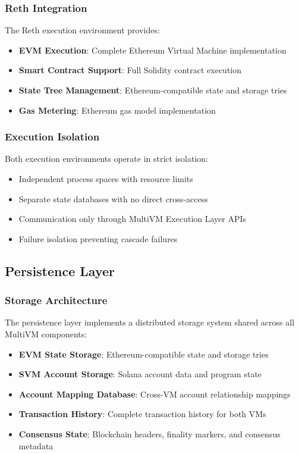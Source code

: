 \documentclass[11pt,a4paper]{article}
\begin{document}
\subsubsection{Reth Integration}
The Reth execution environment provides:
\begin{itemize}
    \item \textbf{EVM Execution}: Complete Ethereum Virtual Machine implementation
    \item \textbf{Smart Contract Support}: Full Solidity contract execution
    \item \textbf{State Tree Management}: Ethereum-compatible state and storage tries
    \item \textbf{Gas Metering}: Ethereum gas model implementation
\end{itemize}

\subsubsection{Execution Isolation}
Both execution environments operate in strict isolation:
\begin{itemize}
    \item Independent process spaces with resource limits
    \item Separate state databases with no direct cross-access
    \item Communication only through MultiVM Execution Layer APIs
    \item Failure isolation preventing cascade failures
\end{itemize}

\subsection{Persistence Layer}

\subsubsection{Storage Architecture}
The persistence layer implements a distributed storage system shared across all MultiVM components:

\begin{itemize}
    \item \textbf{EVM State Storage}: Ethereum-compatible state and storage tries
    \item \textbf{SVM Account Storage}: Solana account data and program state
    \item \textbf{Account Mapping Database}: Cross-VM account relationship mappings
    \item \textbf{Transaction History}: Complete transaction history for both VMs
    \item \textbf{Consensus State}: Blockchain headers, finality markers, and consensus metadata
\end{itemize}
\end{document}
